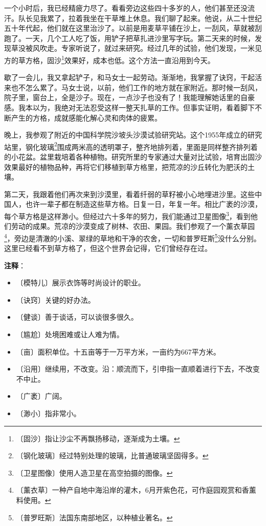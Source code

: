 \documentclass[12pt,UTF-8,openany]{ctexbook}
\begin{document}
\begin{Large}
    一个小时后，我已经精疲力尽了。看看旁边这些四十多岁的人，他们甚至还没流汗。队长见我累了，拉着我坐在干草堆上休息。我们聊了起来。他说，从二十世纪五十年代起，他们就在这里治沙了。以前是用麦草平铺在沙上，一刮风，草就被刮跑了。一天，几个工人吃了饭，用铲子把草扎进沙里写字玩。第二天来的时候，发现草没被风吹走。专家听说了，就过来研究。经过几年的试验，他们发现，一米见方的草方格，固沙\footnote{〔固沙〕指让沙尘不再飘扬移动，逐渐成为土壤。}效果好，成本也低。这个方法一直沿用到今天。
    
    歇了一会儿，我又拿起铲子，和马女士一起劳动。渐渐地，我掌握了诀窍，干起活来也不怎么累了。马女士说，以前，他们工作的地方就在家附近。那时候一刮风，院子里，窗台上，全是沙子。现在，一点沙子也没有了！我能理解她话里的自豪感。我本以为，我绝对无法忍受这样一整天扎草的工作。但事实证明，看着脚下不断产生的方格，成就感能化解心灵和肉体的疲累。
    
    晚上，我参观了附近的中国科学院沙坡头沙漠试验研究站。这个1955年成立的研究站里，钢化玻璃\footnote{〔钢化玻璃〕经过特别处理的玻璃，比普通玻璃坚固得多。}围成两米高的透明罩子，整齐地排列着，里面是同样整齐排列着的小花盆。盆里栽培着各种植物。研究所里的专家通过大量对比试验，培育出固沙效果最好的植物品种，再将它们移植到草方格里，把荒凉的沙丘转化为肥沃的土壤。
    
    第二天，我跟着他们再次来到沙漠里，看着纤弱的草籽被小心地埋进沙里。这些中国人，也许一辈子都在制造这些草方格。日复一日，年复一年。相比广袤的沙漠，每个草方格是这样渺小。但经过六十多年的努力，我们能通过卫星图像\footnote{〔卫星图像〕使用人造卫星在高空拍摄的图像。}，看到他们劳动的成果。荒凉的沙漠变成了树林、农田、果园。我们参观了一个薰衣草园\footnote{〔薰衣草〕一种产自地中海沿岸的灌木，6月开紫色花，可作庭园观赏和香薰料使用。}，旁边是清澈的小溪、翠绿的草地和干净的农舍，一切和普罗旺斯\footnote{〔普罗旺斯〕法国东南部地区，以种植业著名。}没什么分别。这里已经看不到草方格了，但这个世界会记得，它们曾经存在过。
    
\end{Large}


\newpage

\textbf{注释}：

\vspace{-1em}

\begin{itemize}
    \setlength\itemsep{-0.2em}
    \item 〔模特儿〕展示衣饰等时尚设计的职业。
    \item 〔诀窍〕关键的好办法。
    \item 〔健谈〕善于谈话，可以谈很多很久。
    \item 〔尴尬〕处境困难或让人难为情。
    \item 〔亩〕面积单位。十五亩等于一万平方米，一亩约为667平方米。
    \item 〔沿用〕继续用，不改变。沿：顺流而下，引申指一直顺着进行下去，不改变不中止。
    \item 〔广袤〕广阔。
    \item 〔渺小〕指非常小。
\end{itemize}
\end{document}
